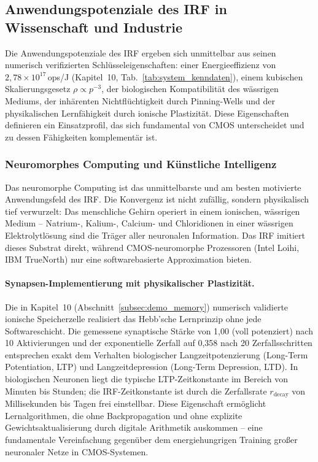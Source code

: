 ﻿\documentclass[a4paper,12pt]{scrreprt}
\theoremstyle{definition}
\begin{document}
\subsection{Anwendungspotenziale des IRF in Wissenschaft und Industrie}
\label{sec:anwendungen}

Die Anwendungspotenziale des IRF ergeben sich unmittelbar aus seinen
numerisch verifizierten Schlüsseleigenschaften: einer Energieeffizienz von
$2{,}78 \times 10^{17}$\,ops/J (Kapitel~10, Tab.~\ref{tab:system_kenndaten}),
einem kubischen Skalierungsgesetz $\rho \propto p^{-3}$, der biologischen
Kompatibilität des wässrigen Mediums, der inhärenten Nichtflüchtigkeit durch
Pinning-Wells und der physikalischen Lernfähigkeit durch ionische Plastizität.
Diese Eigenschaften definieren ein Einsatzprofil, das sich fundamental von
CMOS unterscheidet und zu dessen Fähigkeiten komplementär ist.

\subsubsection{Neuromorphes Computing und Künstliche Intelligenz}
\label{subsubsec:neuromorph}

Das neuromorphe Computing ist das unmittelbarste und am besten
motivierte Anwendungsfeld des IRF. Die Konvergenz ist nicht zufällig,
sondern physikalisch tief verwurzelt: Das menschliche Gehirn operiert in
einem ionischen, wässrigen Medium -- Natrium-, Kalium-, Calcium- und
Chloridionen in einer wässrigen Elektrolytlösung sind die Träger aller
neuronalen Information. Das IRF imitiert dieses Substrat direkt, während
CMOS-neuromorphe Prozessoren (Intel Loihi, IBM TrueNorth) nur eine
softwarebasierte Approximation bieten.

\paragraph{Synapsen-Implementierung mit physikalischer Plastizität.}
Die in Kapitel~10 (Abschnitt~\ref{subsec:demo_memory}) numerisch validierte
ionische Speicherzelle realisiert das Hebb'sche Lernprinzip ohne jede
Softwareschicht. Die gemessene synaptische Stärke von 1,00 (voll potenziert)
nach 10 Aktivierungen und der exponentielle Zerfall auf 0,358 nach
20 Zerfallsschritten entsprechen exakt dem Verhalten biologischer
Langzeitpotenzierung (Long-Term Potentiation, LTP) und
Langzeitdepression (Long-Term Depression, LTD). In biologischen
Neuronen liegt die typische LTP-Zeitkonstante im Bereich von Minuten
bis Stunden; die IRF-Zeitkonstante ist durch die Zerfallsrate $r_\text{decay}$
von Millisekunden bis Tagen frei einstellbar. Diese Eigenschaft
ermöglicht Lernalgorithmen, die ohne Backpropagation und ohne
explizite Gewichtsaktualisierung durch digitale Arithmetik auskommen --
eine fundamentale Vereinfachung gegenüber dem energiehungrigen Training
großer neuronaler Netze in CMOS-Systemen.
\end{document}
